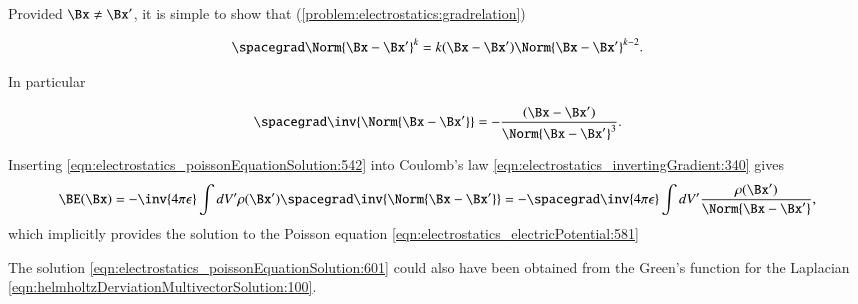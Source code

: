 %
%
Provided \( \Bx \ne \Bx' \), it is simple to show that (\cref{problem:electrostatics:gradrelation})

\begin{dmath}\label{eqn:electrostatics_poissonEquationSolution:541}
\spacegrad \Norm{\Bx - \Bx'}^k = k (\Bx - \Bx') \Norm{ \Bx - \Bx' }^{k-2}.
\end{dmath}

In particular

\begin{dmath}\label{eqn:electrostatics_poissonEquationSolution:542}
\spacegrad \inv{\Norm{\Bx - \Bx'}} = - \frac{(\Bx - \Bx')}{\Norm{ \Bx - \Bx' }^{3}}.
\end{dmath}

Inserting \cref{eqn:electrostatics_poissonEquationSolution:542} into Coulomb's law \cref{eqn:electrostatics_invertingGradient:340} gives
\begin{dmath}\label{eqn:electrostatics_poissonEquationSolution:661}
\BE(\Bx)
=
-\inv{4 \pi \epsilon} \int dV' \rho(\Bx') \spacegrad \inv{\Norm{\Bx - \Bx'}}
=
- \spacegrad \inv{4 \pi \epsilon} \int dV' \frac{\rho(\Bx')}{\Norm{\Bx - \Bx'}},
\end{dmath}
which implicitly provides the solution to the Poisson equation \cref{eqn:electrostatics_electricPotential:581}


The solution \cref{eqn:electrostatics_poissonEquationSolution:601} could also have been obtained from the Green's function for the Laplacian
\cref{eqn:helmholtzDerviationMultivectorSolution:100}.
